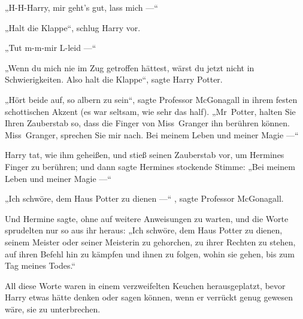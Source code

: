 „H-H-Harry, mir geht’s gut, lass mich —“

„Halt die Klappe“, schlug Harry vor.

„Tut m-m-mir L-leid —“

„Wenn du mich nie im Zug getroffen hättest, wärst du jetzt nicht in Schwierigkeiten. Also halt die Klappe“, sagte Harry Potter.

„Hört beide auf, so albern zu sein“, sagte Professor McGonagall in ihrem festen schottischen Akzent (es war seltsam, wie sehr das half).
„Mr~Potter, halten Sie Ihren Zauberstab so, dass die Finger von Miss~Granger ihn berühren können. Miss~Granger, sprechen Sie mir nach. Bei meinem Leben und meiner Magie —“

Harry tat, wie ihm geheißen, und stieß seinen Zauberstab vor, um Hermines Finger zu berühren; und dann sagte Hermines stockende Stimme:
„Bei meinem Leben und meiner Magie —“

„Ich schwöre, dem Haus Potter zu dienen —“ , sagte Professor McGonagall.

Und Hermine sagte, ohne auf weitere Anweisungen zu warten, und die Worte sprudelten nur so aus ihr heraus:
„Ich schwöre, dem Haus Potter zu dienen, seinem Meister oder seiner Meisterin zu gehorchen, zu ihrer Rechten zu stehen, auf ihren Befehl hin zu kämpfen und ihnen zu folgen, wohin sie gehen, bis zum Tag meines Todes.“

All diese Worte waren in einem verzweifelten Keuchen herausgeplatzt, bevor Harry etwas hätte denken oder sagen können, wenn er verrückt genug gewesen wäre, sie zu unterbrechen.

